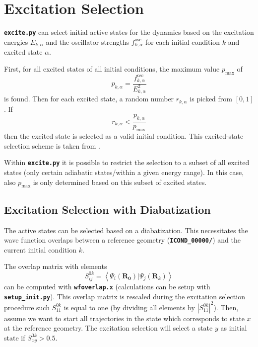 \documentclass[a4paper,10pt,DIV=15,openany]{scrbook}
\newcommand{\ttt}[1]{\textbf{\texttt{#1}}}
\newcommand{\VEC}[1]{\ensuremath{\mathbf{#1}}}
\begin{document}

\section{Excitation Selection}\label{met:exc_selection}

\ttt{excite.py} can select initial active states for the dynamics based on the excitation energies $E_{k,\alpha}$ and the oscillator strengths $f^{\text{osc}}_{k,\alpha}$ for each initial condition $k$ and excited state $\alpha$. 

First, for all excited states of all initial conditions, the maximum value $p_{\text{max}}$ of 
\begin{equation}
  p_{k,\alpha}=\frac{f^{\text{osc}}_{k,\alpha}}{E_{k,\alpha}^2} \label{eq:exc_prob}
\end{equation}
is found. Then for each excited state, a random number $r_{k,\alpha}$ is picked from $[0,1]$. If
\begin{equation}
  r_{k,\alpha}<\frac{p_{k,\alpha}}{p_{\text{max}}}
\end{equation}
then the excited state is selected as a valid initial condition. This excited-state selection scheme is taken from \cite{Barbatti2011}.

Within \ttt{excite.py} it is possible to restrict the selection to a subset of all excited states (only certain adiabatic states/within a given energy range). In this case, also $p_{\text{max}}$ is only determined based on this subset of excited states.

\subsection{Excitation Selection with Diabatization}\label{met:exc_diabatic}

The active states can be selected based on a diabatization.
This necessitates the wave function overlaps between a reference geometry (\ttt{ICOND\_00000/}) and the current initial condition $k$.

The overlap matrix with elements
\begin{equation}
  S^{0k}_{ij}=\left\langle \Psi_i(\VEC{R_0})|\Psi_j(\VEC{R}_k)\right\rangle
\end{equation}
can be computed with \ttt{wfoverlap.x} (calculations can be setup with \ttt{setup\_init.py}).
This overlap matrix is rescaled during the excitation selection procedure such $S^{0k}_{11}$ is equal to one (by dividing all elements by $|S^{0k}_{11}|^2$).
Then, assume we want to start all trajectories in the state which corresponds to state $x$ at the reference geometry.
The excitation selection will select a state $y$ as initial state if $S^{0k}_{xy}>0.5$.
\end{document}
